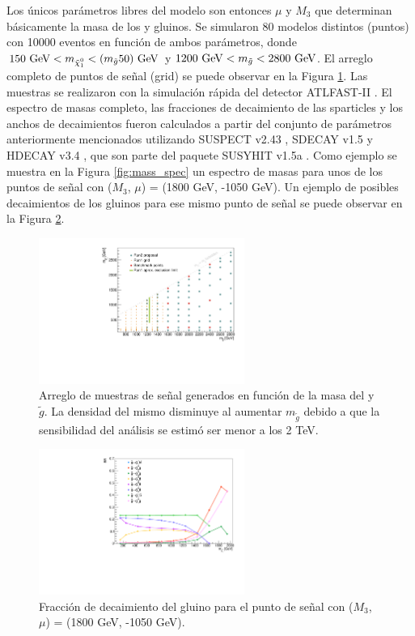 Los únicos parámetros libres del modelo son entonces $\mu$ y $M_3$ que determinan básicamente la masa de los \ninoone y gluinos. Se simularon 80 modelos distintos (puntos) con 10000 eventos en función de ambos parámetros, donde $150\ \gev<m_{\ninoone}<(m_{\tilde{g}}50)\ \gev$ y $1200\ \gev < m_{\tilde{g}}<2800\ \gev$. El arreglo completo de puntos de señal (grid) se puede observar en la Figura \ref{fig:grid_points}. Las muestras se realizaron con la simulación rápida del detector \textsc{ATLFAST-II} . El espectro de masas completo, las fracciones de decaimiento de las sparticles y los anchos de decaimientos fueron calculados a partir del conjunto de parámetros anteriormente mencionados utilizando SUSPECT v2.43 \cite{Djouadi2007426}, SDECAY v1.5 \cite{Muhlleitner:2004mka} y HDECAY v3.4 \cite{Djouadi:1997yw}, que son parte del paquete SUSYHIT v1.5a \cite{Djouadi:2006bz}.
Como ejemplo se muestra en la Figura \ref{fig:mass_spec} un espectro de masas para unos de los puntos de señal con ($M_3$, $\mu$) = (1800 GeV, -1050 GeV). Un ejemplo de posibles decaimientos de los gluinos para ese mismo punto de señal se puede observar en la Figura \ref{fig:gluino_decays}. 

\begin{figure}
  \centering
  \includegraphics[width=0.6\textwidth]{images/analysis/phb_grid.pdf}
  \caption{Arreglo de muestras de señal generados en función de la masa del \ninoone y $\tilde{g}$. La densidad del mismo disminuye al aumentar $m_{\tilde{g}}$ debido a que la sensibilidad del análisis se estimó ser menor a los 2 TeV.}
  \label{fig:grid_points}
\end{figure}

\begin{figure}
  \centering
  \includegraphics[width=0.6\textwidth]{images/analysis/phb_go_br.pdf}
  \caption{Fracción de decaimiento del gluino para el punto de señal con ($M_3$, $\mu$) = (1800 GeV, -1050 GeV). }
  \label{fig:gluino_decays}
\end{figure}

